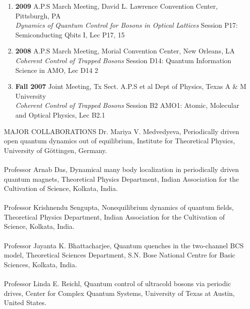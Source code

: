 \documentclass[a4paper,11pt]{article}
\begin{document}
\begin{enumerate}
\item
{\bf 2009} A.P.S March Meeting, \hfill {David L. Lawrence Convention Center, Pittsburgh, PA}\\
{\it Dynamics of Quantum Control for Bosons in Optical Lattices} Session P17: Semiconducting Qbits I, Lec P17, 15\\

\item
{\bf 2008} A.P.S March Meeting, \hfill {Morial Convention Center, New Orleans, LA} \\
{\it Coherent Control of Trapped Bosons} Session D14: Quantum Information Science in AMO, Lec D14 2 \\

 \item
{\bf Fall 2007} Joint Meeting, Tx Sect. A.P.S et al \hfill {Dept of Physics, Texas A \& M University}\\
{\it Coherent Control of Trapped Bosons} Session B2 AMO1: Atomic, Molecular and Optical Physics, Lec B2.1\\

\end{enumerate}

  \begin{CVsimplestuff}{MAJOR COLLABORATIONS}
    Dr. Mariya V. Medvedyeva, Periodically driven open quantum dynamics out of equilibrium, Institute for Theoretical Physics, University of G\"ottingen, Germany. \\ \\
    Professor Arnab Das, Dynamical many body localization in periodically driven quantum magnets, Theoretical Physics Department,
    Indian Association for the Cultivation of Science, Kolkata, India. \\ \\
    Professor Krishnendu Sengupta, Nonequilibrium dynamics of quantum fields, Theoretical Physics Department,
    Indian Association for the Cultivation of Science, Kolkata, India. \\   \\ 
    Professor Jayanta K. Bhattacharjee, Quantum quenches in the two-channel BCS model, Theoretical Sciences Department,
    S.N. Bose National Centre for Basic Sciences, Kolkata, India. \\  \\    
    Professor Linda E. Reichl, Quantum control of ultracold bosons via periodic drives, Center for Complex Quantum Systems, University of Texas at Austin, United States.  
  \end{CVsimplestuff}
\end{document}
